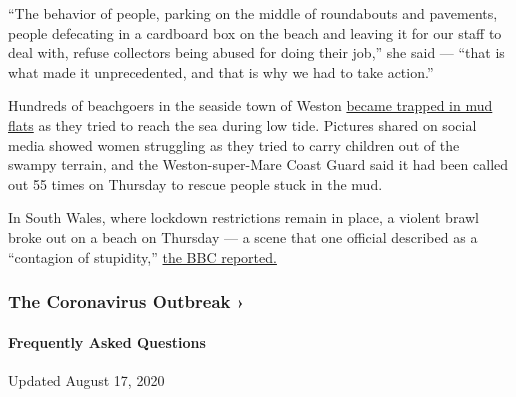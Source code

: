 ``The behavior of people, parking on the middle of roundabouts and
pavements, people defecating in a cardboard box on the beach and leaving
it for our staff to deal with, refuse collectors being abused for doing
their job,'' she said --- ``that is what made it unprecedented, and that
is why we had to take action.''

Hundreds of beachgoers in the seaside town of Weston
\href{https://www.somersetlive.co.uk/news/somerset-news/tourists-trapped-mud-flats-trying-4265533}{became
trapped in mud flats} as they tried to reach the sea during low tide.
Pictures shared on social media showed women struggling as they tried to
carry children out of the swampy terrain, and the Weston-super-Mare
Coast Guard said it had been called out 55 times on Thursday to rescue
people stuck in the mud.

In South Wales, where lockdown restrictions remain in place, a violent
brawl broke out on a beach on Thursday --- a scene that one official
described as a ``contagion of stupidity,''
\href{https://www.bbc.co.uk/news/uk-wales-53186920}{the BBC reported.}

\href{https://www.nytimes3xbfgragh.onion/news-event/coronavirus?action=click\&pgtype=Article\&state=default\&region=MAIN_CONTENT_3\&context=storylines_faq}{}

\hypertarget{the-coronavirus-outbreak-}{%
\subsubsection{The Coronavirus Outbreak
›}\label{the-coronavirus-outbreak-}}

\hypertarget{frequently-asked-questions}{%
\paragraph{Frequently Asked
Questions}\label{frequently-asked-questions}}

Updated August 17, 2020

